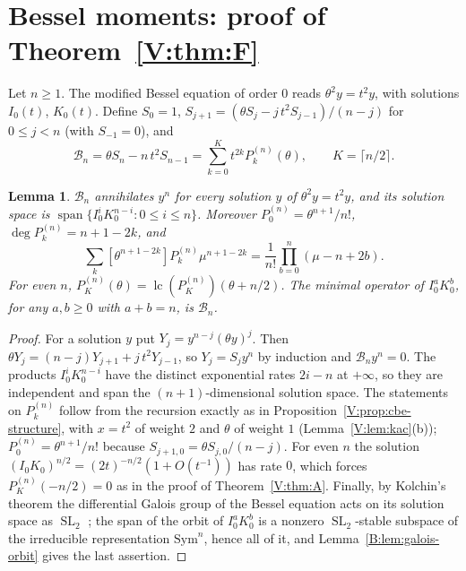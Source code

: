 \documentclass[11pt,a4paper]{article}
\newtheorem{lemma}[theorem]{Lemma}
\theoremstyle{definition}
\theoremstyle{remark}
\newcommand{\cl}[1]{\lceil #1\rceil}
\DeclareMathOperator{\SL}{SL}
\DeclareMathOperator{\spn}{span}
\DeclareMathOperator{\lc}{lc}
\numberwithin{equation}{section}
\begin{document}
\section{Bessel moments: proof of Theorem~\ref{V:thm:F}}\label{V:sec:bessel}

Let $n\ge1$. The modified Bessel equation of order $0$ reads $\theta^2y=t^2y$, with solutions $I_0(t)$, $K_0(t)$. Define $S_0=1$, $S_{j+1}=(\theta S_j-j\,t^2S_{j-1})/(n-j)$ for $0\le j<n$ (with $S_{-1}=0$), and
\[
\mathcal B_n=\theta S_n-n\,t^2S_{n-1}=\sum_{k=0}^{K}t^{2k}P^{(n)}_k(\theta),\qquad K=\cl{n/2}.
\]

\begin{lemma}\label{V:lem:sympow}
$\mathcal B_n$ annihilates $y^n$ for every solution $y$ of $\theta^2y=t^2y$, and its solution space is $\spn\{I_0^iK_0^{n-i}:0\le i\le n\}$. Moreover $P^{(n)}_0=\theta^{n+1}/n!$, $\deg P^{(n)}_k=n+1-2k$, and
\[
\sum_k[\theta^{n+1-2k}]P^{(n)}_k\mu^{n+1-2k}=\frac1{n!}\prod_{b=0}^n(\mu-n+2b).
\] For even $n$, $P^{(n)}_K(\theta)=\lc(P^{(n)}_K)(\theta+n/2)$. The minimal operator of $I_0^aK_0^b$, for any $a,b\ge0$ with $a+b=n$, is $\mathcal B_n$.
\end{lemma}

\begin{proof}
For a solution $y$ put $Y_j=y^{n-j}(\theta y)^j$. Then $\theta Y_j=(n-j)Y_{j+1}+j\,t^2Y_{j-1}$, so $Y_j=S_jy^n$ by induction and $\mathcal B_ny^n=0$. The products $I_0^iK_0^{n-i}$ have the distinct exponential rates $2i-n$ at $+\infty$, so they are independent and span the $(n+1)$-dimensional solution space. The statements on $P^{(n)}_k$ follow from the recursion exactly as in Proposition~\ref{V:prop:cbe-structure}, with $x=t^2$ of weight $2$ and $\theta$ of weight $1$ (Lemma~\ref{V:lem:kac}(b)); $P^{(n)}_0=\theta^{n+1}/n!$ because $S_{j+1,0}=\theta S_{j,0}/(n-j)$. For even $n$ the solution $(I_0K_0)^{n/2}=(2t)^{-n/2}(1+O(t^{-1}))$ has rate $0$, which forces $P^{(n)}_K(-n/2)=0$ as in the proof of Theorem~\ref{V:thm:A}. Finally, by Kolchin's theorem the differential Galois group of the Bessel equation acts on its solution space as $\SL_2$ \cite{Kol68,vdPS03}; the span of the orbit of $I_0^aK_0^b$ is a nonzero $\SL_2$-stable subspace of the irreducible representation $\mathrm{Sym}^n$, hence all of it, and Lemma~\ref{B:lem:galois-orbit} gives the last assertion.
\end{proof}
\end{document}
